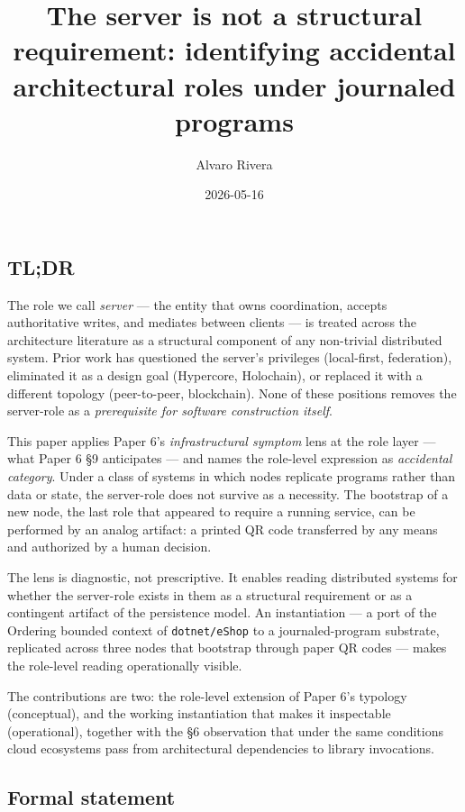 \documentclass[
]{article}
\title{The server is not a structural requirement: identifying
accidental architectural roles under journaled programs}
\author{Alvaro Rivera}
\date{2026-05-16}
\begin{document}
\maketitle

\subsection{TL;DR}\label{tldr}

The role we call \emph{server} --- the entity that owns coordination,
accepts authoritative writes, and mediates between clients --- is
treated across the architecture literature as a structural component of
any non-trivial distributed system. Prior work has questioned the
server's privileges (local-first, federation), eliminated it as a design
goal (Hypercore, Holochain), or replaced it with a different topology
(peer-to-peer, blockchain). None of these positions removes the
server-role as a \emph{prerequisite for software construction itself}.

This paper applies Paper 6's \emph{infrastructural symptom} lens at the
role layer --- what Paper 6 §9 anticipates --- and names the role-level
expression as \emph{accidental category}. Under a class of systems in
which nodes replicate programs rather than data or state, the
server-role does not survive as a necessity. The bootstrap of a new
node, the last role that appeared to require a running service, can be
performed by an analog artifact: a printed QR code transferred by any
means and authorized by a human decision.

The lens is diagnostic, not prescriptive. It enables reading distributed
systems for whether the server-role exists in them as a structural
requirement or as a contingent artifact of the persistence model. An
instantiation --- a port of the Ordering bounded context of
\texttt{dotnet/eShop} to a journaled-program substrate, replicated
across three nodes that bootstrap through paper QR codes --- makes the
role-level reading operationally visible.

The contributions are two: the role-level extension of Paper 6's
typology (conceptual), and the working instantiation that makes it
inspectable (operational), together with the §6 observation that under
the same conditions cloud ecosystems pass from architectural
dependencies to library invocations.

\subsection{Formal statement}\label{formal-statement}
\end{document}
